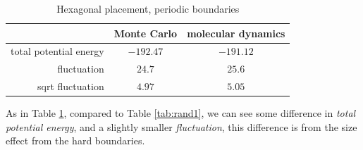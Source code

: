 \documentclass[UTF8,a4paper]{article}
\begin{document}
\begin{table}[H]
	\centering
	\caption{Hexagonal placement, periodic boundaries}
	\begin{tabular}{rcc}
		\toprule
		\toprule
		                       & Monte Carlo & molecular dynamics \\ \midrule
		total potential energy & $-192.47$   & $-191.12$          \\
		fluctuation            & $24.7$      & $25.6$             \\
		sqrt fluctuation       & $4.97$      & $5.05$             \\
		\bottomrule
	\end{tabular}%
	\label{tab:rand_hard1}%
\end{table}%
As in Table \ref{tab:rand_hard1}, compared to Table \ref{tab:rand1}, we can see some difference in \textit{total potential energy}, and a slightly smaller \textit{fluctuation},
this difference is from the size effect from the hard boundaries.
\end{document}
